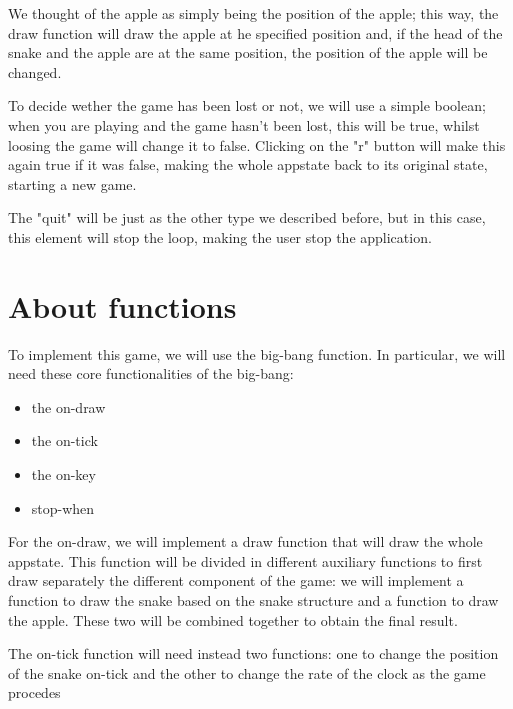 \documentclass{article}
\begin{document}
	We thought of the apple as simply being the position of the apple; this way, the draw function will draw the apple at he specified position and, if the head of the snake and the apple are at the same position, the position of the apple will be changed.
	
	To decide wether the game has been lost or not, we will use a simple boolean; when you are playing and the game hasn't been lost, this will be true, whilst loosing the game will change it to false. Clicking on the "r" button will make this again true if it was false, making the whole appstate back to its original state, starting a new game. 
	
	The "quit" will be just as the other type we described before, but in this case, this element will stop the loop, making the user stop the application.
	
	\section{About functions}
	To implement this game, we will use the big-bang function. In particular, we will need these core functionalities of the big-bang: 
	\begin{itemize}
		\item the on-draw
		\item the on-tick
		\item the on-key
		\item stop-when
	\end{itemize}
	
	For the on-draw, we will implement a draw function that will draw the whole appstate. This function will be divided in different auxiliary functions to first draw separately the different component of the game: we will implement a function to draw the snake based on the snake structure and a function to draw the apple. These two will be combined together to obtain the final result.
	
	The on-tick function will need instead two functions: one to change the position of the snake on-tick and the other to change the rate of the clock as the game procedes 
\end{document}
